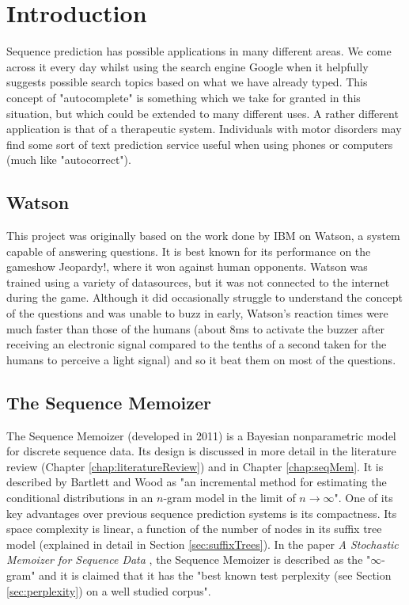 \chapter{Introduction}


Sequence prediction has possible applications in many different areas. We come across it every day whilst using the search engine Google when it helpfully suggests possible search topics based on what we have already typed. This concept of "autocomplete" is something which we take for granted in this situation, but which could be extended to many different uses. A rather different application is that of a therapeutic system. Individuals with motor disorders may find some sort of text prediction service useful when using phones or computers (much like "autocorrect"). 

\section{Watson}

This project was originally based on the work done by IBM on Watson, a system capable of answering questions. It is best known for its performance on the gameshow Jeopardy!, where it won against human opponents. Watson was trained using a variety of datasources, but it was not connected to the internet during the game. Although it did occasionally struggle to understand the concept of the questions and was unable to buzz in early, Watson's reaction times were much faster than those of the humans (about 8ms to activate the buzzer after receiving an electronic signal compared to the tenths of a second taken for the humans to perceive a light signal) and so it beat them on most of the questions.

\section{The Sequence Memoizer}

The Sequence Memoizer (developed in 2011) is a Bayesian nonparametric model for discrete sequence data. Its design is discussed in more detail in the literature review (Chapter \ref{chap:literatureReview}) and in Chapter \ref{chap:seqMem}. It is described by Bartlett and Wood \cite{bartlett2011deplump} as "an incremental method for estimating the conditional distributions in an $n$-gram model in the limit of $n\to\infty$". One of its key advantages over previous sequence prediction systems is its compactness. Its space complexity is linear, a function of the number of nodes in its suffix tree model (explained in detail in Section \ref{sec:suffixTrees}). In the paper \textit{A Stochastic Memoizer for Sequence Data} \cite{wood2009stochastic}, the Sequence Memoizer is described as the "$\infty$-gram" and it is claimed that it has the "best known test perplexity (see Section \ref{sec:perplexity}) on a well studied corpus". 

